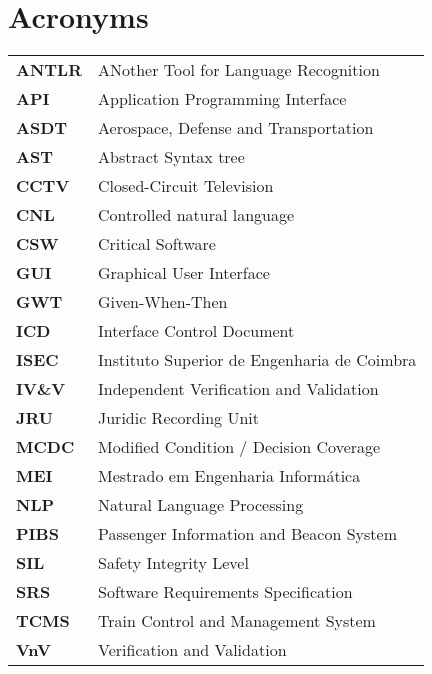 \chapter*{Acronyms}

    \setlength{\LTleft}{0pt}
    \begin{longtable}{l l}
    \textbf{ANTLR}      &   ANother Tool for Language Recognition\\
    \textbf{API}        &   Application Programming Interface\\
    \textbf{ASDT}       &   Aerospace, Defense and Transportation\\
    \textbf{AST}        &   Abstract Syntax tree\\
    \textbf{CCTV}       &   Closed-Circuit Television\\
    \textbf{CNL}        &   Controlled natural language\\
    \textbf{CSW}        &   Critical Software\\
    \textbf{GUI}        &   Graphical User Interface\\
    \textbf{GWT}        &   Given-When-Then\\
    \textbf{ICD}        &   Interface Control Document\\
    \textbf{ISEC}       &   Instituto Superior de Engenharia de Coimbra\\
    \textbf{IV\&V}      &   Independent Verification and Validation\\
    \textbf{JRU}        &   Juridic Recording Unit\\
    \textbf{MCDC}       &   Modified Condition / Decision Coverage\\
    \textbf{MEI}        &   Mestrado em Engenharia Informática \\
    \textbf{NLP}        &   Natural Language Processing \\
    \textbf{PIBS}       &   Passenger Information and Beacon System \\
    \textbf{SIL}        &   Safety Integrity Level \\
    \textbf{SRS}        &   Software Requirements Specification \\
    \textbf{TCMS}       &   Train Control and Management System \\
    \textbf{VnV}        &   Verification and Validation \\
    \end{longtable}
    \label{tab:my_label}
